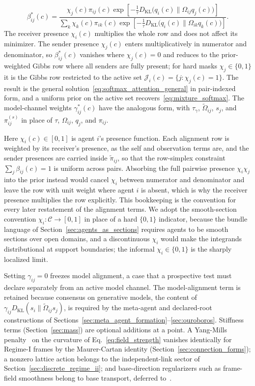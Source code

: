 \documentclass[11pt]{article}
\begin{document}
\begin{equation}
\beta_{ij}^*(c) =
\frac{
  \chi_{j}(c)\pi_{ij}(c)\exp\left[
    -\tfrac{1}{\tau}D_{\mathrm{KL}}\big(q_i(c) \big\| \Omega_{ij}q_j(c)\big)
  \right]
}{
  \displaystyle\sum_{k}
  \chi_{k}(c)\pi_{ik}(c)\exp\left[
    -\tfrac{1}{\tau}D_{\mathrm{KL}}\big(q_i(c) \big\| \Omega_{ik}q_k(c)\big)
  \right]
}.
\label{eq:beta_optimal}
\end{equation}
The receiver presence $\chi_i(c)$ multiplies the whole row and does not affect its minimizer. The sender presence $\chi_j(c)$ enters multiplicatively in numerator and denominator, so $\beta^*_{ij}(c)$ vanishes where $\chi_j(c) = 0$ and reduces to the prior-weighted Gibbs row where all senders are fully present; for hard masks $\chi_j \in \{0, 1\}$ it is the Gibbs row restricted to the active set $\mathcal{J}_i(c) = \{j : \chi_j(c) = 1\}$. The result is the general solution~\eqref{eq:softmax_attention_general} in pair-indexed form, and a uniform prior on the active set recovers~\eqref{eq:mixture_softmax}. The model-channel weights $\gamma_{ij}^*(c)$ have the analogous form, with $\tau_\gamma$, $\tilde{\Omega}_{ij}$, $s_j$, and $\pi^{(s)}_{ij}$ in place of $\tau$, $\Omega_{ij}$, $q_j$, and $\pi_{ij}$.

Here $\chi_i(c) \in [0, 1]$ is agent $i$'s presence function. Each alignment row is weighted by its receiver's presence, as the self and observation terms are, and the sender presences are carried inside $\tilde{\pi}_{ij}$, so that the row-simplex constraint $\sum_j \beta_{ij}(c) = 1$ is uniform across pairs. Absorbing the full pairwise presence $\chi_i\chi_j$ into the prior instead would cancel $\chi_i$ between numerator and denominator and leave the row with unit weight where agent $i$ is absent, which is why the receiver presence multiplies the row explicitly. This bookkeeping is the convention for every later restatement of the alignment terms. We adopt the smooth-section convention $\chi_i: \mathcal{C} \to [0, 1]$ in place of a hard $\{0, 1\}$ indicator, because the bundle language of Section~\ref{sec:agents_as_sections} requires agents to be smooth sections over open domains, and a discontinuous $\chi_i$ would make the integrands distributional at support boundaries; the informal $\chi_i \in \{0, 1\}$ is the sharply localized limit.

Setting $\gamma_{ij} = 0$ freezes model alignment, a case that a prospective test must declare separately from an active model channel. The model-alignment term is retained because consensus on generative models, the content of $\gamma_{ij}D_{\mathrm{KL}}(s_i\|\tilde{\Omega}_{ij}s_j)$, is required by the meta-agent and declared-root constructions of Sections~\ref{sec:meta_agent_formation}--\ref{sec:ouroboros}. Stiffness terms (Section~\ref{sec:mass}) are optional additions at a point. A Yang-Mills penalty~\cite{Yang1954} on the curvature of Eq.~\eqref{eq:field_strength} vanishes identically for Regime-I frames by the Maurer-Cartan identity (Section~\ref{sec:connection_forms}); a nonzero lattice action belongs to the independent-link sector of Section~\ref{sec:discrete_regime_ii}; and base-direction regularizers such as frame-field smoothness belong to base transport, deferred to~\cite[Ch.~B4]{DennisGaugeVFESuppB2026}.
\end{document}

